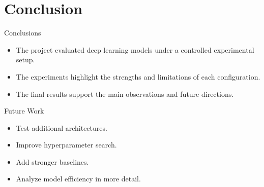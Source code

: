
\section{Conclusion}

\begin{frame}{Conclusions}
  \small
  \begin{itemize}
    \item The project evaluated deep learning models under a controlled experimental setup.
    \item The experiments highlight the strengths and limitations of each configuration.
    \item The final results support the main observations and future directions.
  \end{itemize}
\end{frame}

\begin{frame}{Future Work}
  \small
  \begin{itemize}
    \item Test additional architectures.
    \item Improve hyperparameter search.
    \item Add stronger baselines.
    \item Analyze model efficiency in more detail.
  \end{itemize}
\end{frame}
